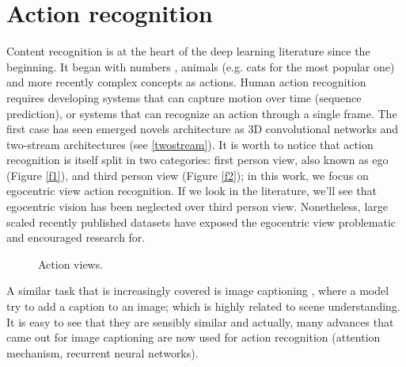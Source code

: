 \documentclass[12pt, a4paper]{report}
\begin{document}
	\section{Action recognition}\label{action_recognition}
	Content recognition is at the heart of the deep learning literature since the beginning. It began with numbers \cite{lecun_98}, animals (e.g. cats for the most popular one) and more recently complex concepts as actions.
	Human action recognition requires developing systems that can capture motion over time (sequence prediction), or systems that can recognize an action through a single frame.
	The first case has seen emerged novels architecture as 3D convolutional networks \cite{ji} and two-stream architectures (see \ref{twostream}).
	It is worth to notice that action recognition is itself split in two categories: first person view, also known as \gls{ego} (Figure \ref{f1}), and third person view (Figure \ref{f2}); in this work, we focus on egocentric view action recognition.
	If we look in the literature, we'll see that egocentric vision has been neglected over third person view.
	Nonetheless, large scaled recently published datasets have exposed the egocentric view problematic and encouraged research for.\\
	\begin{figure}[!tbp]
		\centering
		\hfill
		\caption{Action views.}
	\end{figure}
	
	A similar task that is increasingly covered is image captioning \cite{xu}, where a model try to add a caption to an image; which is highly related to scene understanding.
	It is easy to see that they are sensibly similar and actually, many advances that came out for image captioning are now used for action recognition (attention mechanism, recurrent neural networks).
	
\end{document}
